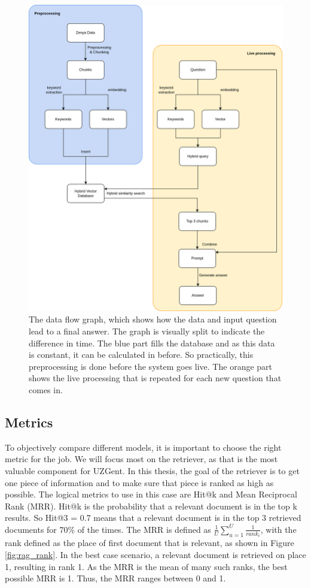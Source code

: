 \begin{figure}[H]
    \centerline{\includegraphics[width=0.8\linewidth]{fig/dataflow_graph.png}}
    \caption{The data flow graph, which shows how the data and input question lead to a final answer. The graph is visually split to indicate the difference in time. The blue part fills the database and as this data is constant, it can be calculated in before. So practically, this preprocessing is done before the system goes live. The orange part shows the live processing that is repeated for each new question that comes in.}
    \label{fig:dataflow_graph}
\end{figure}

\subsection{Metrics}
To objectively compare different models, it is important to choose the right metric for the job. We will focus most on the retriever, as that is the most valuable component for UZGent. In this thesis, the goal of the retriever is to get one piece of information and to make sure that piece is ranked as high as possible. The logical metrics to use in this case are Hit@k and Mean Reciprocal Rank (MRR). Hit@k is the probability that a relevant document is in the top k results. So Hit@3 = 0.7 means that a relevant document is in the top 3 retrieved documents for 70\% of the times. The MRR is defined as $\frac{1}{U} \sum_{u=1}^U \frac{1}{rank_i}$, with the rank defined as the place of first document that is relevant, as shown in Figure \ref{fig:rag_rank}. In the best case scenario, a relevant document is retrieved on place 1, resulting in rank 1. As the MRR is the mean of many such ranks, the best possible MRR is 1. Thus, the MRR ranges between 0 and 1.

